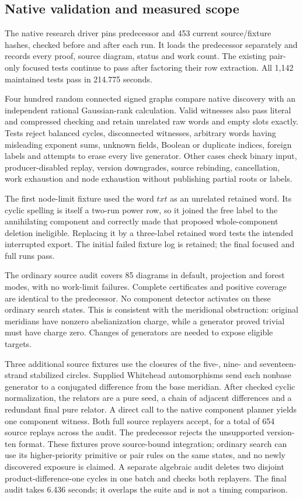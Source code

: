 \subsection{Native validation and measured scope}

The native  research driver pins predecessor
 and 453 current source/fixture hashes, checked before and
after each run. It loads the predecessor separately and records every proof,
source diagram, status and work count. The existing pair-only focused tests
continue to pass after factoring their row extraction. All 1,142 maintained
tests pass in 214.775 seconds.

Four hundred random connected signed graphs compare native discovery with
an independent rational Gaussian-rank calculation. Valid witnesses also pass
literal and compressed checking and retain unrelated raw words and empty
slots exactly. Tests reject balanced cycles, disconnected witnesses, arbitrary
words having misleading exponent sums, unknown fields, Boolean or duplicate
indices, foreign labels and attempts to erase every live generator. Other
cases check binary input, producer-disabled replay, version downgrades,
source rebinding, cancellation, work exhaustion and node exhaustion without
publishing partial roots or labels.

The first node-limit fixture used the word $t x t$ as an unrelated retained
word. Its cyclic spelling is itself a two-run power row, so it joined the
free label to the annihilating component and correctly made that proposed
whole-component deletion ineligible. Replacing it by a three-label retained
word tests the intended interrupted export. The initial failed fixture log
is retained; the final focused and full runs pass.

The ordinary source audit covers 85 diagrams in default, projection and forest
modes, with no work-limit failures. Complete certificates and positive coverage
are identical to the predecessor. No component detector activates on these
ordinary search states. This is consistent with the meridional obstruction:
original meridians have nonzero abelianization charge, while a generator proved
trivial must have charge zero. Changes of generators are needed to expose
eligible targets.

Three additional source fixtures use the closures of the five-, nine- and
seventeen-strand stabilized circles. Supplied Whitehead automorphisms send each
nonbase generator to a conjugated difference from the base meridian. After
checked cyclic normalization, the relators are a pure seed, a chain of
adjacent differences and a redundant final pure relator. A direct call to the
native component planner yields one component witness. Both full source
replayers accept, for a total of 654 source replays across the audit. The
predecessor rejects the unsupported version-ten format. These fixtures prove
source-bound integration; ordinary search can use its higher-priority primitive
or pair rules on the same states, and no newly discovered exposure is claimed.
A separate algebraic audit deletes two disjoint product-difference-one cycles
in one batch and checks both replayers. The final audit takes 6.436 seconds;
it overlaps the suite and is not a timing comparison.


